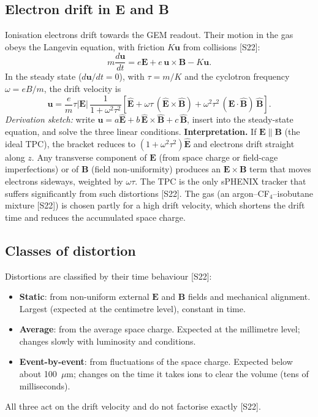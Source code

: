 \documentclass[11pt,letterpaper]{article}
\begin{document}
\subsection{Electron drift in E and B}
Ionisation electrons drift towards the GEM readout. Their motion in the gas obeys the Langevin equation, with friction $K\mathbf{u}$ from collisions [S22]:
\begin{equation}
m\frac{d\mathbf{u}}{dt} = e\mathbf{E} + e\,\mathbf{u}\times\mathbf{B} - K\mathbf{u}.
\end{equation}
In the steady state ($d\mathbf{u}/dt=0$), with $\tau=m/K$ and the cyclotron frequency $\omega=eB/m$, the drift velocity is
\begin{equation}
\mathbf{u} = \frac{e}{m}\tau|\mathbf{E}|\,\frac{1}{1+\omega^2\tau^2}\left[\hat{\mathbf{E}} + \omega\tau\,(\hat{\mathbf{E}}\times\hat{\mathbf{B}}) + \omega^2\tau^2\,(\hat{\mathbf{E}}\cdot\hat{\mathbf{B}})\,\hat{\mathbf{B}}\right].
\end{equation}
\emph{Derivation sketch:} write $\mathbf{u}=a\hat{\mathbf E}+b\,\hat{\mathbf E}\times\hat{\mathbf B}+c\,\hat{\mathbf B}$, insert into the steady-state equation, and solve the three linear conditions.
\textbf{Interpretation.} If $\mathbf{E}\parallel\mathbf{B}$ (the ideal TPC), the bracket reduces to $(1+\omega^2\tau^2)\hat{\mathbf E}$ and electrons drift straight along $z$.
Any transverse component of $\mathbf{E}$ (from space charge or field-cage imperfections) or of $\mathbf{B}$ (field non-uniformity) produces an $\mathbf{E}\times\mathbf{B}$ term that moves electrons sideways, weighted by $\omega\tau$.
The TPC is the only sPHENIX tracker that suffers significantly from such distortions [S22].
The gas (an argon--CF$_4$--isobutane mixture [S22]) is chosen partly for a high drift velocity, which shortens the drift time and reduces the accumulated space charge.

\subsection{Classes of distortion}
Distortions are classified by their time behaviour [S22]:
\begin{itemize}
\item \textbf{Static}: from non-uniform external $\mathbf{E}$ and $\mathbf{B}$ fields and mechanical alignment. Largest (expected at the centimetre level), constant in time.
\item \textbf{Average}: from the average space charge. Expected at the millimetre level; changes slowly with luminosity and conditions.
\item \textbf{Event-by-event}: from fluctuations of the space charge. Expected below about 100~$\mu$m; changes on the time it takes ions to clear the volume (tens of milliseconds).
\end{itemize}
All three act on the drift velocity and do not factorise exactly [S22].
\end{document}
